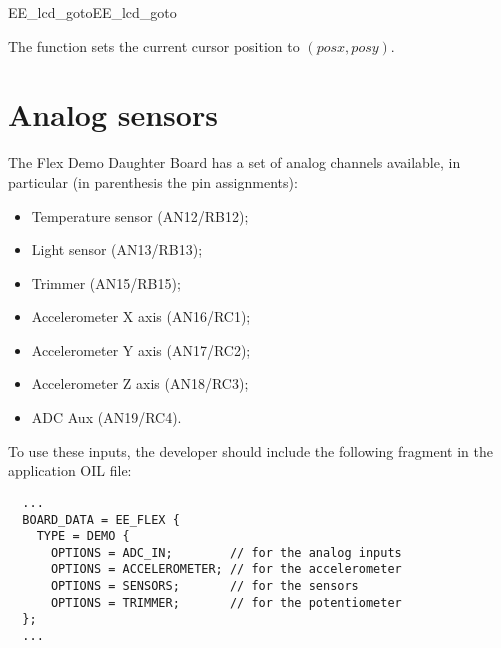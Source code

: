 \begin{function_nopb2}{EE\_lcd\_goto}{EE_lcd_goto}
  
  \begin{fundescription}
    The function sets the current cursor position to $(posx, posy)$.
  \end{fundescription}
  
  \begin{funparameters}
  \end{funparameters}
  
  
\end{function_nopb2}



\section{Analog sensors}

The Flex Demo Daughter Board has a set of analog channels available,
in particular (in parenthesis the pin assignments): 

\begin{itemize}
\item Temperature sensor (AN12/RB12);
\item Light sensor (AN13/RB13);
\item Trimmer (AN15/RB15);
\item Accelerometer X axis (AN16/RC1);
\item Accelerometer Y axis (AN17/RC2);
\item Accelerometer Z axis (AN18/RC3);
\item ADC Aux (AN19/RC4).
\end{itemize}

To use these inputs, the developer should
include the following fragment in the application OIL file:

\begin{lstlisting}
  ...
  BOARD_DATA = EE_FLEX {
    TYPE = DEMO {
      OPTIONS = ADC_IN;        // for the analog inputs 
      OPTIONS = ACCELEROMETER; // for the accelerometer
      OPTIONS = SENSORS;       // for the sensors
      OPTIONS = TRIMMER;       // for the potentiometer
  };
  ...
\end{lstlisting}

